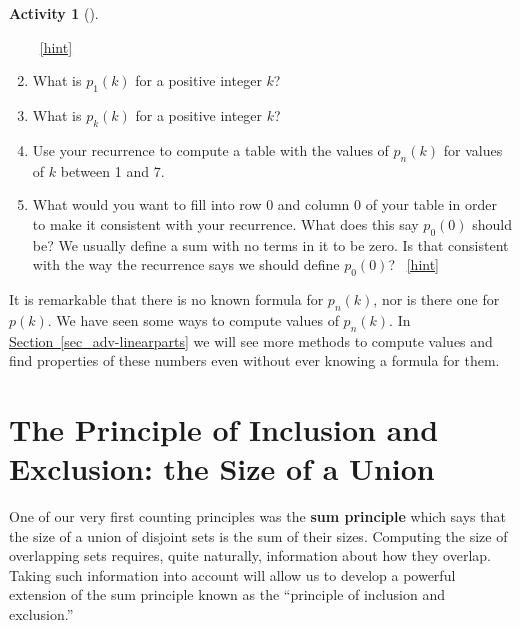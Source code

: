 \documentclass[10pt,]{book}
\newcommand{\terminology}[1]{\textbf{#1}}
\theoremstyle{plain}
\theoremstyle{definition}
\theoremstyle{definition}
\theoremstyle{definition}
\newtheorem{activity}[project]{Activity}
\numberwithin{equation}{chapter}
\begin{document}
\begin{activity}[]
\begin{enumerate}[font=\bfseries,label=(\alph*),ref=\alph*]
~\hfill{\tiny\hyperlink{a-215.d}{[hint]}\hypertarget{q-215.d}{}}\item\label{task-223} \hypertarget{p-1159}{}%
What is \(p_1(k)\) for a positive integer \(k\)?%
\item\label{task-224} \hypertarget{p-1161}{}%
What is \(p_k(k)\) for a positive integer \(k\)?%
\item\label{task-225} \hypertarget{p-1163}{}%
Use your recurrence to compute a table with the values of \(p_n(k)\) for values of \(k\) between 1 and 7.%
\item\label{task-226} \hypertarget{p-1164}{}%
What would you want to fill into row 0 and column 0 of your table in order to make it consistent with your recurrence.  What does this say \(p_0(0)\) should be?  We usually define a sum with no terms in it to be zero. Is that consistent with the way the recurrence says we should define \(p_0(0)\)?%
~\hfill{\tiny\hyperlink{a-215.h}{[hint]}\hypertarget{q-215.h}{}}\end{enumerate}
\end{activity}
\hypertarget{p-1167}{}%
It is remarkable that there is no known formula for \(p_n(k)\), nor is there one for \(p(k)\). We have seen some ways to compute values of \(p_n(k)\).  In \hyperref[sec_adv-linearparts]{Section~\ref{sec_adv-linearparts}} we will see more methods to compute values and find properties of these numbers even without ever knowing a formula for them.%
\typeout{************************************************}
\typeout{************************************************}
\section[{The Principle of Inclusion and Exclusion: the Size of a Union}]{The Principle of Inclusion and Exclusion: the Size of a Union}\label{sec_adv-pie}
\hypertarget{p-1168}{}%
One of our very first counting principles was the \terminology{sum principle} which says that the size of a union of disjoint sets is the sum of their sizes. Computing the size of overlapping sets requires, quite naturally, information about how they overlap. Taking such information into account will allow us to develop a powerful extension of the sum principle known as the ``principle of inclusion and exclusion.''%
\typeout{************************************************}
\typeout{************************************************}
\end{document}
